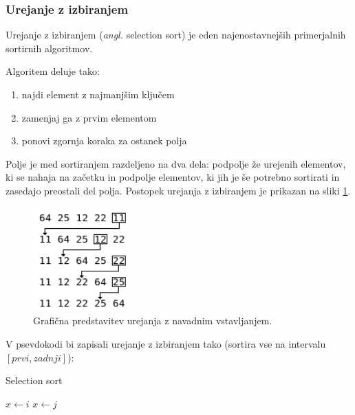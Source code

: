 \documentclass[a4paper,oneside]{article}
\begin{document}
\subsubsection{Urejanje z izbiranjem}
\label{chapter:selectionsort}
Urejanje z izbiranjem (\emph{angl.} selection sort) je eden najenostavnejših primerjalnih sortirnih
algoritmov.

Algoritem deluje tako:
\begin{enumerate}
  \item najdi element z najmanjšim ključem
  \item zamenjaj ga z prvim elementom
  \item ponovi zgornja koraka za ostanek polja
\end{enumerate}

Polje je med sortiranjem razdeljeno na dva dela: podpolje že urejenih elementov, ki se
nahaja na začetku in podpolje elementov, ki jih je še potrebno sortirati in zasedajo
preostali del polja.
Postopek urejanja z izbiranjem je prikazan na sliki \ref{fig:selectionsortimage}.

\begin{figure}[h]
    \begin{center}
        \includegraphics[height=40mm]{slike/selectionsort.png}
    \end{center}
    \vspace{-0.7cm}
    \caption{Grafična predstavitev urejanja z navadnim vstavljanjem.}
    \label{fig:selectionsortimage}
\end{figure}

V psevdokodi bi zapisali urejanje z izbiranjem tako (sortira vse na intervalu
$\left[prvi, zadnji\right]$):


\begin{algorithm}
  \caption{Selection sort}\label{algo:selectionsort}
  \begin{algorithmic}[1]
            \State $x \gets i$
                    \State $x \gets j$
                \EndIf
            \EndFor
        \EndFor
    \EndFunction
  \end{algorithmic}
\end{algorithm}
\end{document}
